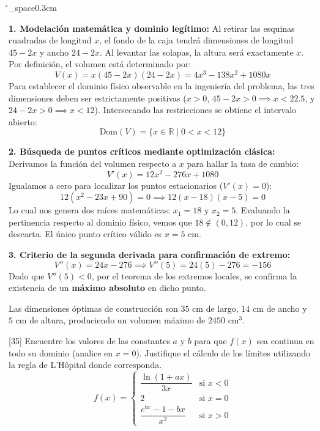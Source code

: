\documentclass[11pt,paper=a4,answers, addpoints]{exam}
\begin{document}
\begin{questions}
\begin{center}
\end{center}
\v_space{0.3cm}

\begin{solution}
\textbf{1. Modelación matemática y dominio legítimo:}
Al retirar las esquinas cuadradas de longitud $x$, el fondo de la caja tendrá dimensiones de longitud $45 - 2x$ y ancho $24 - 2x$. Al levantar las solapas, la altura será exactamente $x$. Por definición, el volumen está determinado por:
\[
V(x) = x(45-2x)(24-2x) = 4x^3 - 138x^2 + 1080x
\]
Para establecer el dominio físico observable en la ingeniería del problema, las tres dimensiones deben ser estrictamente positivas ($x > 0$, $45-2x > 0 \implies x < 22.5$, y $24-2x > 0 \implies x < 12$). Intersecando las restricciones se obtiene el intervalo abierto:
\[
\text{Dom}(V) = \{x \in \mathbb{R} \mid 0 < x < 12\}
\]

\textbf{2. Búsqueda de puntos críticos mediante optimización clásica:}
Derivamos la función del volumen respecto a $x$ para hallar la tasa de cambio:
\[
V'(x) = 12x^2 - 276x + 1080
\]
Igualamos a cero para localizar los puntos estacionarios ($V'(x) = 0$):
\[
12(x^2 - 23x + 90) = 0 \implies 12(x-18)(x-5) = 0
\]
Lo cual nos genera dos raíces matemáticas: $x_1 = 18$ y $x_2 = 5$. 
Evaluando la pertinencia respecto al dominio físico, vemos que $18 \notin (0,12)$, por lo cual se descarta. El único punto crítico válido es $x = 5\text{ cm}$.

\textbf{3. Criterio de la segunda derivada para confirmación de extremo:}
\[
V''(x) = 24x - 276 \implies V''(5) = 24(5) - 276 = -156
\]
Dado que $V''(5) < 0$, por el teorema de los extremos locales, se confirma la existencia de un \textbf{máximo absoluto} en dicho punto. 

Las dimensiones óptimas de construcción son $35\text{ cm}$ de largo, $14\text{ cm}$ de ancho y $5\text{ cm}$ de altura, produciendo un volumen máximo de $\boxed{2450\text{ cm}^3}$.
\end{solution}


[35]
Encuentre los valores de las constantes $a$ y $b$ para que $f(x)$ sea continua en todo su dominio (analice en $x = 0$). Justifique el cálculo de los límites utilizando la regla de L'Hôpital donde corresponda.
\[
f(x) = \begin{cases} 
\dfrac{\ln(1+ax)}{3x} & \text{si } x < 0 \\ 
2 & \text{si } x = 0 \\ 
\dfrac{e^{bx} - 1 - bx}{x^2} & \text{si } x > 0 
\end{cases}
\]


\end{questions}
\end{document}
